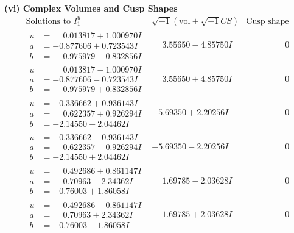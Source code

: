 \documentclass[1p]{elsarticle_modified}
\theoremstyle{definition}
\newcommand{\I}{\sqrt{-1}}
\begin{document}
\newpage\flushleft \textbf{(vi) Complex Volumes and Cusp Shapes}
$$\begin{array}{c|c|c}  
\text{Solutions to }I^u_{1}& \I (\text{vol} + \sqrt{-1}CS) & \text{Cusp shape}\\
 \hline 
\begin{aligned}
u &= \phantom{-}0.013817 + 1.000970 I \\
a &= -0.877606 + 0.723543 I \\
b &= \phantom{-}0.975979 - 0.832856 I\end{aligned}
 & \phantom{-}3.55650 - 4.85750 I & \phantom{-0.000000 } 0 \\ \hline\begin{aligned}
u &= \phantom{-}0.013817 - 1.000970 I \\
a &= -0.877606 - 0.723543 I \\
b &= \phantom{-}0.975979 + 0.832856 I\end{aligned}
 & \phantom{-}3.55650 + 4.85750 I & \phantom{-0.000000 } 0 \\ \hline\begin{aligned}
u &= -0.336662 + 0.936143 I \\
a &= \phantom{-}0.622357 + 0.926294 I \\
b &= -2.14550 - 2.04462 I\end{aligned}
 & -5.69350 + 2.20256 I & \phantom{-0.000000 } 0 \\ \hline\begin{aligned}
u &= -0.336662 - 0.936143 I \\
a &= \phantom{-}0.622357 - 0.926294 I \\
b &= -2.14550 + 2.04462 I\end{aligned}
 & -5.69350 - 2.20256 I & \phantom{-0.000000 } 0 \\ \hline\begin{aligned}
u &= \phantom{-}0.492686 + 0.861147 I \\
a &= \phantom{-}0.70963 - 2.34362 I \\
b &= -0.76003 + 1.86058 I\end{aligned}
 & \phantom{-}1.69785 - 2.03628 I & \phantom{-0.000000 } 0 \\ \hline\begin{aligned}
u &= \phantom{-}0.492686 - 0.861147 I \\
a &= \phantom{-}0.70963 + 2.34362 I \\
b &= -0.76003 - 1.86058 I\end{aligned}
 & \phantom{-}1.69785 + 2.03628 I & \phantom{-0.000000 } 0 \\ \hline\begin{aligned}

\end{aligned}
\end{array}$$
\end{document}
